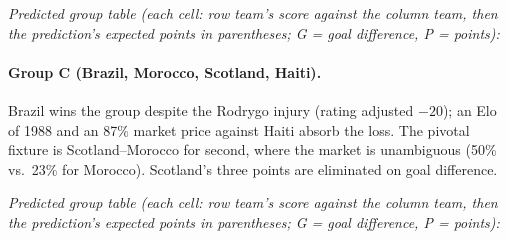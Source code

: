 \documentclass[11pt,letterpaper]{article}
\begin{document}
\noindent\textit{\footnotesize Predicted group table (each cell: row team's score against the column team, then the prediction's expected points in parentheses; G = goal difference, P = points):}



\paragraph{Group C (Brazil, Morocco, Scotland, Haiti).} Brazil wins the group despite the Rodrygo injury (rating adjusted $-20$); an Elo of 1988 and an 87\% market price against Haiti absorb the loss. The pivotal fixture is Scotland--Morocco for second, where the market is unambiguous (50\% vs.\ 23\% for Morocco). Scotland's three points are eliminated on goal difference.

\noindent\textit{\footnotesize Predicted group table (each cell: row team's score against the column team, then the prediction's expected points in parentheses; G = goal difference, P = points):}
\end{document}
